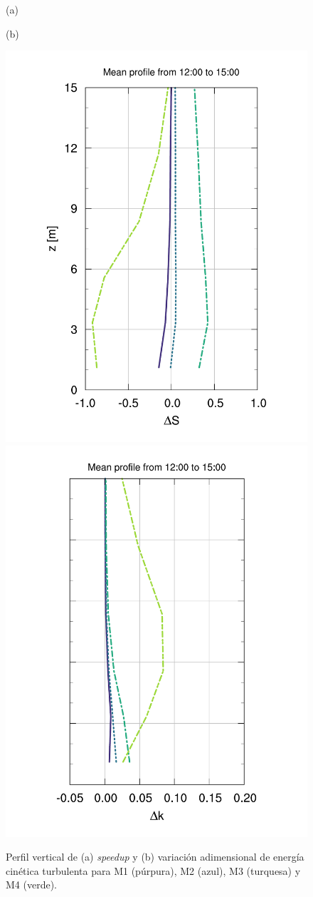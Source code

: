 \begin{figure}[H]
	\begin{minipage}{0.5\linewidth}
		\centering
		\hspace{7mm}(a)\end{minipage}%
	\begin{minipage}{0.5\linewidth}
		\centering
		\hspace{-5mm}(b)\end{minipage}%
	
	\centering
	\includegraphics[height=0.75\linewidth,page=1,trim={28mm 10mm 25mm 23mm},clip]{Imagenes/06/bol/V_masts}%
	\includegraphics[height=0.75\linewidth,page=1,trim={30mm 10mm 17mm 20mm},clip]{Imagenes/06/bol/k_masts}%
	\vspace{-2mm}\caption{Perfil vertical de (a) \emph{speedup} y (b) variación adimensional de energía cinética turbulenta para M1 (púrpura), M2 (azul), M3 (turquesa) y M4 (verde).}
	\label{fig:06_bol_mast_tke_speedup}
\end{figure}

